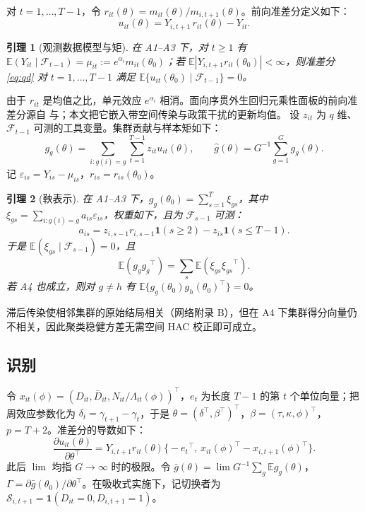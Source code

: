 \documentclass[11pt,a4paper]{ctexart}
\newtheorem{lemma}{引理}
\theoremstyle{definition}
\newcommand{\E}{\mathbb{E}}
\newcommand{\F}{\mathcal{F}}
\newcommand{\ind}{\mathbf{1}}
\newcommand{\Sw}{\mathcal{S}}
\begin{document}
对 $t=1,\dots,T-1$，令 $r_{it}(\theta)=m_{it}(\theta)/m_{i,t+1}(\theta)$。前向准差分\citep{chamberlain1992sequential,wooldridge1997multiplicative}定义如下：
\begin{equation}
u_{it}(\theta)=Y_{i,t+1}\,r_{it}(\theta)-Y_{it}.
\label{eq:qd}
\end{equation}

\begin{lemma}[观测数据模型与矩]
\label{lem:moment}
在 A1--A3 下，对 $t\ge 1$ 有 $\E(Y_{it}\mid\F_{t-1})=\mu_{it}:=e^{\alpha_i}m_{it}(\theta_0)$；若 $\E|Y_{i,t+1}r_{it}(\theta_0)|<\infty$，则准差分 \eqref{eq:qd} 对 $t=1,\dots,T-1$ 满足 $\E\{u_{it}(\theta_0)\mid\F_{t-1}\}=0$。
\end{lemma}

由于 $r_{it}$ 是均值之比，单元效应 $e^{\alpha_i}$ 相消。面向序贯外生回归元乘性面板的前向准差分源自\citet{wooldridge1997multiplicative} 与\citet{windmeijer2000moment}；本文把它嵌入带空间传染与政策干扰的更新均值。
设 $z_{it}$ 为 $q$ 维、$\F_{t-1}$ 可测的工具变量。集群贡献与样本矩如下：
\[
g_g(\theta)=\sum_{i:g(i)=g}\sum_{t=1}^{T-1} z_{it}u_{it}(\theta),\qquad
\hat g(\theta)=G^{-1}\sum_{g=1}^{G}g_g(\theta).
\]
记 $\varepsilon_{is}=Y_{is}-\mu_{is}$，$r_{is}=r_{is}(\theta_0)$。

\begin{lemma}[鞅表示]
\label{lem:mds}
在 A1--A3 下，$g_g(\theta_0)=\sum_{s=1}^{T}\xi_{gs}$，其中 $\xi_{gs}=\sum_{i:g(i)=g}a_{is}\varepsilon_{is}$，权重如下，且为 $\F_{s-1}$ 可测：
\[
a_{is}=z_{i,s-1}r_{i,s-1}\ind(s\ge 2)-z_{is}\ind(s\le T-1).
\]
于是 $\E(\xi_{gs}\mid\F_{s-1})=0$，且
\[
\E(g_g{g_g}^{\top})=\sum_{s}\E(\xi_{gs}{\xi_{gs}}^{\top}).
\]
若 A4 也成立，则对 $g\ne h$ 有 $\E\{g_g(\theta_0)g_h(\theta_0)^{\top}\}=0$。
\end{lemma}

滞后传染使相邻集群的原始结局相关（网络附录 B），但在 A4 下集群得分向量仍不相关，因此聚类稳健方差无需空间 HAC 校正即可成立。

\subsection{识别}
\label{ss:ident}

令 $x_{it}(\phi)=(D_{it},\bar D_{it},N_{it}/\Lambda_{it}(\phi))^{\top}$，$e_t$ 为长度 $T-1$ 的第 $t$ 个单位向量；把周效应参数化为 $\delta_t=\gamma_{t+1}-\gamma_t$，于是 $\theta=(\delta^{\top},\beta^{\top})^{\top}$，$\beta=(\tau,\kappa,\phi)^{\top}$，$p=T+2$。准差分的导数如下：
\begin{equation}
\frac{\partial u_{it}(\theta)}{\partial\theta^{\top}}=Y_{i,t+1}r_{it}(\theta)\bigl\{-{e_t}^{\top},\,x_{it}(\phi)^{\top}-x_{i,t+1}(\phi)^{\top}\bigr\}.
\label{eq:jac}
\end{equation}
此后 $\lim$ 均指 $G\to\infty$ 时的极限。令 $\bar g(\theta)=\lim G^{-1}\sum_g\E g_g(\theta)$，$\Gamma=\partial\bar g(\theta_0)/\partial\theta^{\top}$。在吸收式实施下，记切换者为 $\Sw_{i,t+1}=\ind(D_{it}=0,D_{i,t+1}=1)$。
\end{document}
